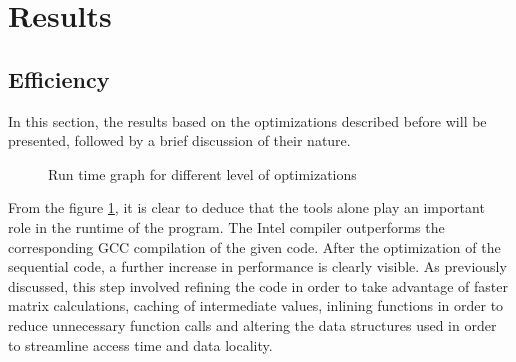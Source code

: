 \documentclass[fleqn,11pt]{SelfArx} %
\theoremstyle{definition}
\begin{document}

\cleardoublepage
\onecolumn
\section{Results}

\subsection{Efficiency}
\label{seq}
In this section, the results based on the optimizations described before will be presented, followed by a brief discussion of their nature.
\begin{figure}[!h]
    \centering
    \caption{Run time graph for different level of optimizations}
    \label{graph:EffOMP}
\end{figure}

From the figure \ref{graph:EffOMP}, it is clear to deduce that the tools alone play an important role in the runtime of the program. The Intel compiler outperforms the corresponding GCC compilation of the given code. After the optimization of the sequential code, a further increase in performance is clearly visible. As previously discussed, this step involved refining the code in order to take advantage of faster matrix calculations, caching of intermediate values, inlining functions in order to reduce unnecessary function calls and altering the data structures used in order to streamline access time and data locality.
\end{document}
